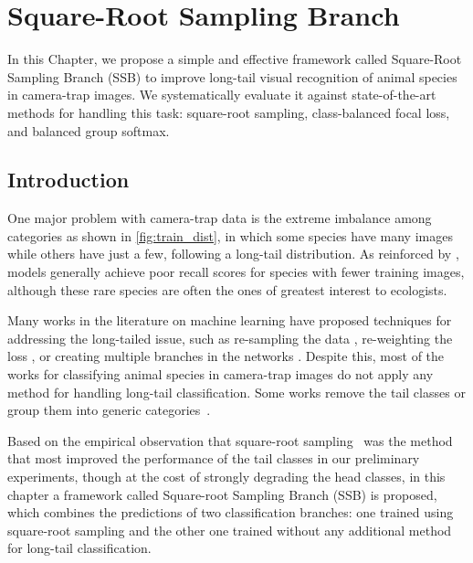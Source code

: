 \chapter{Square-Root Sampling Branch}\label{cap:bagoftricks}

In this Chapter, we propose a simple and effective framework called
Square-Root Sampling Branch (SSB) to improve long-tail visual recognition of
animal species in camera-trap images. We systematically evaluate it against
state-of-the-art methods for handling this task: square-root sampling,
class-balanced focal loss, and balanced group softmax.

\section{Introduction}

One major problem with camera-trap data is the extreme imbalance among
categories as shown in \autoref{fig:train_dist}, in which some species have many
images while others have just a few, following a long-tail distribution. As
reinforced by \citet{schneider2020three}, models generally achieve poor recall
scores for species with fewer training images, although these rare species are
often the ones of greatest interest to ecologists.


Many works in the literature on machine learning have proposed techniques for
addressing the long-tailed issue, such as re-sampling the data
\citep{Kang2020Decoupling}, re-weighting the loss \citep{cui2019class}, or
creating multiple branches in the networks \citep{li2020overcoming,
zhou2020bbn, cai2021ace}. Despite this, most of the works for classifying animal
species in camera-trap images do not apply any method for handling long-tail
classification. Some works remove the tail classes \citep{villa2017towards,
willi2019identifying} or group them into generic
categories~\citep{zualkernan2020towards}.

Based on the empirical observation that square-root
sampling~\citep{Kang2020Decoupling} was the method that most improved the
performance of the tail classes in our preliminary experiments, though at the cost of strongly degrading the
head classes, in this chapter a framework called Square-root Sampling Branch
(SSB) is proposed, which combines the predictions of two classification
branches: one trained using square-root sampling and the other one trained
without any additional method for long-tail classification.

